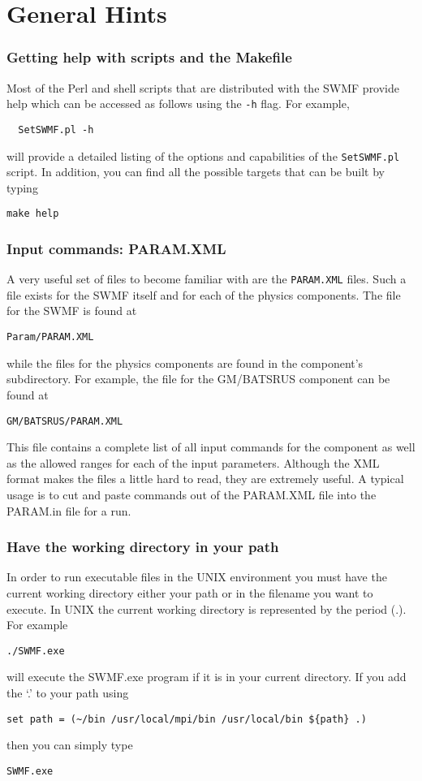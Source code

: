 \section{General Hints}

\subsubsection{Getting help with scripts and the Makefile}
Most of the Perl and shell scripts that are distributed with the SWMF
provide help which can be accessed as follows using the {\tt -h} flag.
For example, 
\begin{verbatim}
  SetSWMF.pl -h
\end{verbatim}
will provide a detailed listing of the options and capabilities of the
{\tt SetSWMF.pl} script.  In addition, you can find all the possible
targets  that can be built by typing
\begin{verbatim}
make help
\end{verbatim}

\subsubsection{Input commands: PARAM.XML}
A very useful set of files to become familiar with are the {\tt PARAM.XML}
files.  Such a file exists for the SWMF itself and for each of the
physics components.  The file for the SWMF is found at
\begin{verbatim}
Param/PARAM.XML
\end{verbatim}
while the files for the physics components are found in the component's
subdirectory.  For example, the file for the GM/BATSRUS component can
be found at
\begin{verbatim}
GM/BATSRUS/PARAM.XML
\end{verbatim}
This file contains a complete list of all input commands for the
component as well as the allowed ranges for each of the input parameters.
Although the XML format makes the files a little hard to read, they are
extremely useful.  A typical usage is to cut and paste commands out of the
PARAM.XML file into the PARAM.in file for a run.

\subsubsection{Have the working directory in your path}
In order to run executable files in the UNIX environment you must have
the current working directory either your path or in the filename you
want to execute.  In UNIX the current working directory is represented
by the period (.).  For example
\begin{verbatim} 
./SWMF.exe
\end{verbatim}
will execute the SWMF.exe program if it is in your current directory.  If you
add the `.' to your path using
\begin{verbatim}
set path = (~/bin /usr/local/mpi/bin /usr/local/bin ${path} .)
\end{verbatim}
then you can simply type
\begin{verbatim} 
SWMF.exe
\end{verbatim}

